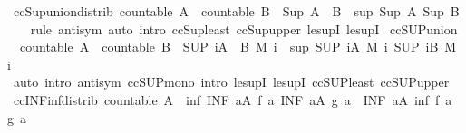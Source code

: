 \begin{isabellebody}
\endisatagproof
{\isafoldproof}%
%
\isadelimproof
\isanewline
%
\endisadelimproof
\isanewline
{}\isamarkupfalse%
\ ccSup{\isacharunderscore}union{\isacharunderscore}distrib{\isacharcolon}\ {\isachardoublequoteopen}countable\ A\ {\isasymLongrightarrow}\ countable\ B\ {\isasymLongrightarrow}\ Sup\ {\isacharparenleft}A\ {\isasymunion}\ B{\isacharparenright}\ {\isacharequal}\ sup\ {\isacharparenleft}Sup\ A{\isacharparenright}\ {\isacharparenleft}Sup\ B{\isacharparenright}{\isachardoublequoteclose}\isanewline
%
\isadelimproof
\ \ %
\endisadelimproof
%
\isatagproof
{}\isamarkupfalse%
\ {\isacharparenleft}rule\ antisym{\isacharparenright}\ {\isacharparenleft}auto\ intro{\isacharcolon}\ ccSup{\isacharunderscore}least\ ccSup{\isacharunderscore}upper\ le{\isacharunderscore}supI{}\ le{\isacharunderscore}supI{}{\isacharparenright}%
\endisatagproof
{\isafoldproof}%
%
\isadelimproof
\isanewline
%
\endisadelimproof
\isanewline
{}\isamarkupfalse%
\ ccSUP{\isacharunderscore}union{\isacharcolon}\isanewline
\ \ {\isachardoublequoteopen}countable\ A\ {\isasymLongrightarrow}\ countable\ B\ {\isasymLongrightarrow}\ {\isacharparenleft}SUP\ i{\isasymin}A\ {\isasymunion}\ B{\isachardot}\ M\ i{\isacharparenright}\ {\isacharequal}\ sup\ {\isacharparenleft}SUP\ i{\isasymin}A{\isachardot}\ M\ i{\isacharparenright}\ {\isacharparenleft}SUP\ i{\isasymin}B{\isachardot}\ M\ i{\isacharparenright}{\isachardoublequoteclose}\isanewline
%
\isadelimproof
\ \ %
\endisadelimproof
%
\isatagproof
{}\isamarkupfalse%
\ {\isacharparenleft}auto\ intro{\isacharbang}{\isacharcolon}\ antisym\ ccSUP{\isacharunderscore}mono\ intro{\isacharcolon}\ le{\isacharunderscore}supI{}\ le{\isacharunderscore}supI{}\ ccSUP{\isacharunderscore}least\ ccSUP{\isacharunderscore}upper{\isacharparenright}%
\endisatagproof
{\isafoldproof}%
%
\isadelimproof
\isanewline
%
\endisadelimproof
\isanewline
{}\isamarkupfalse%
\ ccINF{\isacharunderscore}inf{\isacharunderscore}distrib{\isacharcolon}\ {\isachardoublequoteopen}countable\ A\ {\isasymLongrightarrow}\ inf\ {\isacharparenleft}INF\ a{\isasymin}A{\isachardot}\ f\ a{\isacharparenright}\ {\isacharparenleft}INF\ a{\isasymin}A{\isachardot}\ g\ a{\isacharparenright}\ {\isacharequal}\ {\isacharparenleft}INF\ a{\isasymin}A{\isachardot}\ inf\ {\isacharparenleft}f\ a{\isacharparenright}\ {\isacharparenleft}g\ a{\isacharparenright}{\isacharparenright}{\isachardoublequoteclose}\isanewline
%
\isadelimproof
\ \ %
\endisadelimproof
%
\isatagproof
{}\isamarkupfalse%

\end{isabellebody}
